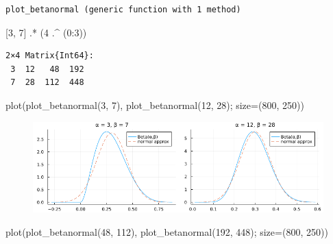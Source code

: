 \documentclass[
  letterpaper,
  DIV=11,
  numbers=noendperiod]{scrartcl}
\newenvironment{Shaded}{\begin{snugshade}}{\end{snugshade}}
\newcommand{\CharTok}[1]{\textcolor[rgb]{0.13,0.47,0.30}{#1}}
\newcommand{\FloatTok}[1]{\textcolor[rgb]{0.68,0.00,0.00}{#1}}
\newcommand{\FunctionTok}[1]{\textcolor[rgb]{0.28,0.35,0.67}{#1}}
\newcommand{\NormalTok}[1]{\textcolor[rgb]{0.00,0.23,0.31}{#1}}
\newcommand{\OperatorTok}[1]{\textcolor[rgb]{0.37,0.37,0.37}{#1}}
\begin{document}
\begin{verbatim}
plot_betanormal (generic function with 1 method)
\end{verbatim}

\begin{Shaded}
\begin{Highlighting}[]
\NormalTok{[}\FloatTok{3}\NormalTok{, }\FloatTok{7}\NormalTok{] }\OperatorTok{.*}\NormalTok{ (}\FloatTok{4} \OperatorTok{.\^{}}\NormalTok{ (}\FloatTok{0}\OperatorTok{:}\FloatTok{3}\NormalTok{))}\CharTok{\textquotesingle{}}
\end{Highlighting}
\end{Shaded}

\begin{verbatim}
2×4 Matrix{Int64}:
 3  12   48  192
 7  28  112  448
\end{verbatim}

\begin{Shaded}
\begin{Highlighting}[]
\FunctionTok{plot}\NormalTok{(}\FunctionTok{plot\_betanormal}\NormalTok{(}\FloatTok{3}\NormalTok{, }\FloatTok{7}\NormalTok{), }\FunctionTok{plot\_betanormal}\NormalTok{(}\FloatTok{12}\NormalTok{, }\FloatTok{28}\NormalTok{); size}\OperatorTok{=}\NormalTok{(}\FloatTok{800}\NormalTok{, }\FloatTok{250}\NormalTok{))}
\end{Highlighting}
\end{Shaded}

\begin{figure}[H]

{\centering \includegraphics{05 Central limit theorem_files/figure-pdf/cell-115-output-1.png}

}

\end{figure}

\begin{Shaded}
\begin{Highlighting}[]
\FunctionTok{plot}\NormalTok{(}\FunctionTok{plot\_betanormal}\NormalTok{(}\FloatTok{48}\NormalTok{, }\FloatTok{112}\NormalTok{), }\FunctionTok{plot\_betanormal}\NormalTok{(}\FloatTok{192}\NormalTok{, }\FloatTok{448}\NormalTok{); size}\OperatorTok{=}\NormalTok{(}\FloatTok{800}\NormalTok{, }\FloatTok{250}\NormalTok{))}
\end{Highlighting}
\end{Shaded}
\end{document}
